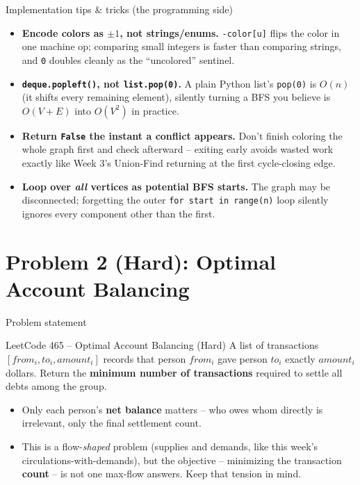 \documentclass[11pt,aspectratio=169]{beamer}
\begin{document}
\begin{frame}{Implementation tips \& tricks (the programming side)}
  \small
  \begin{itemize}
    \item \textbf{Encode colors as $\pm 1$, not strings/enums.} \texttt{-color[u]}
    flips the color in one machine op; comparing small integers is faster than
    comparing strings, and \texttt{0} doubles cleanly as the ``uncolored'' sentinel.
    \item \textbf{\texttt{deque.popleft()}, not \texttt{list.pop(0)}.} A plain Python
    list's \texttt{pop(0)} is $O(n)$ (it shifts every remaining element), silently
    turning a BFS you believe is $O(V+E)$ into $O(V^2)$ in practice.
    \item \textbf{Return \texttt{False} the instant a conflict appears.} Don't finish
    coloring the whole graph first and check afterward -- exiting early avoids wasted
    work exactly like Week 3's Union-Find returning at the first cycle-closing edge.
    \item \textbf{Loop over \emph{all} vertices as potential BFS starts.} The graph may
    be disconnected; forgetting the outer \texttt{for start in range(n)} loop silently
    ignores every component other than the first.
  \end{itemize}
\end{frame}

\section{Problem 2 (Hard): Optimal Account Balancing}

\begin{frame}{Problem statement}
  \begin{block}{LeetCode 465 -- Optimal Account Balancing (\textcolor{red!60!black}{Hard})}
    A list of transactions $[from_i, to_i, amount_i]$ records that person $from_i$
    gave person $to_i$ exactly $amount_i$ dollars. Return the \textbf{minimum number of
    transactions} required to settle all debts among the group.
  \end{block}
  \begin{itemize}
    \item Only each person's \textbf{net balance} matters -- who owes whom directly is
    irrelevant, only the final settlement count.
    \item This is a flow-\emph{shaped} problem (supplies and demands, like this week's
    circulations-with-demands), but the objective -- minimizing the transaction
    \textbf{count} -- is not one max-flow answers. Keep that tension in mind.
  \end{itemize}
\end{frame}
\end{document}
